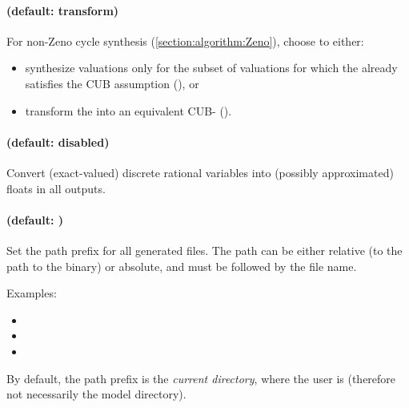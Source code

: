 \paragraph{ (default: transform)}
For non-Zeno cycle synthesis (\cref{section:algorithm:Zeno}), choose to either:
\begin{itemize}
	\item synthesize valuations only for the subset of valuations for which the \NIPTA{} already satisfies the CUB assumption (), or
	\item transform the \NIPTA{} into an equivalent CUB-\NIPTA{} ().
\end{itemize}



\paragraph{ (default: disabled)}
Convert (exact-valued) discrete rational variables into (possibly approximated) floats in all outputs.


\paragraph{ (default: )}
Set the path prefix for all generated files.
The path can be either relative (to the path to the \stylePath{\binimitator{}} binary) or absolute, and must be followed by the file name.

Examples:
\begin{itemize}
	\item {}
	\item {}
	\item {}
\end{itemize}

By default, the path prefix is the \emph{current directory}, \ie{} where the user is (therefore not necessarily the model directory).








